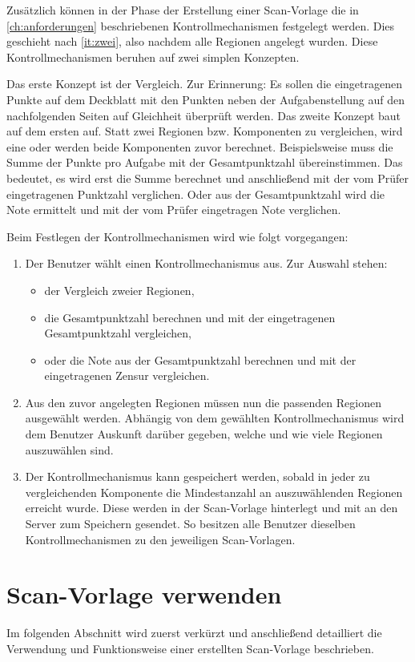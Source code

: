 \documentclass[notables, nomenclature, oneside, 150]{HSMW-Thesis}
\begin{document}
 		Zusätzlich können in der Phase der Erstellung einer Scan-Vorlage die in \autoref{ch:anforderungen} beschriebenen Kontrollmechanismen festgelegt werden. Dies geschieht nach \autoref{it:zwei}, also nachdem alle Regionen angelegt wurden. Diese Kontrollmechanismen beruhen auf zwei simplen Konzepten. 

 		Das erste Konzept ist der Vergleich. Zur Erinnerung: Es sollen die eingetragenen Punkte auf dem Deckblatt mit den Punkten neben der Aufgabenstellung auf den nachfolgenden Seiten auf Gleichheit überprüft werden. Das zweite Konzept baut auf dem ersten auf. Statt zwei Regionen bzw. Komponenten zu vergleichen, wird eine oder werden beide Komponenten zuvor berechnet. Beispielsweise muss die Summe der Punkte pro Aufgabe mit der Gesamtpunktzahl übereinstimmen. Das bedeutet, es wird erst die Summe berechnet und anschließend mit der vom Prüfer eingetragenen Punktzahl verglichen. Oder aus der Gesamtpunktzahl wird die Note ermittelt und mit der vom Prüfer eingetragen Note verglichen. 
 	
 		Beim Festlegen der Kontrollmechanismen wird wie folgt vorgegangen:
 		\begin{enumerate}
 			\item Der Benutzer wählt einen Kontrollmechanismus aus. Zur Auswahl stehen:
 				\begin{itemize}
 					\item der Vergleich zweier Regionen,
 					\item die Gesamtpunktzahl berechnen und mit der eingetragenen Gesamtpunktzahl vergleichen,
 					\item oder die Note aus der Gesamtpunktzahl berechnen und mit der eingetragenen Zensur vergleichen.
 				\end{itemize}
 			\item Aus den zuvor angelegten Regionen müssen nun die passenden Regionen ausgewählt werden. Abhängig von dem gewählten Kontrollmechanismus wird dem Benutzer Auskunft darüber gegeben, welche und wie viele Regionen auszuwählen sind.
 			\item Der Kontrollmechanismus kann gespeichert werden, sobald in jeder zu vergleichenden Komponente die Mindestanzahl an auszuwählenden Regionen erreicht wurde. Diese werden in der Scan-Vorlage hinterlegt und mit an den Server zum Speichern gesendet. So besitzen alle Benutzer dieselben Kontrollmechanismen  zu den jeweiligen Scan-Vorlagen.
 		\end{enumerate}

 	\section{Scan-Vorlage verwenden}
 		Im folgenden Abschnitt wird zuerst verkürzt und anschließend detailliert die Verwendung und Funktionsweise einer erstellten Scan-Vorlage beschrieben. 
 	
\end{document}
